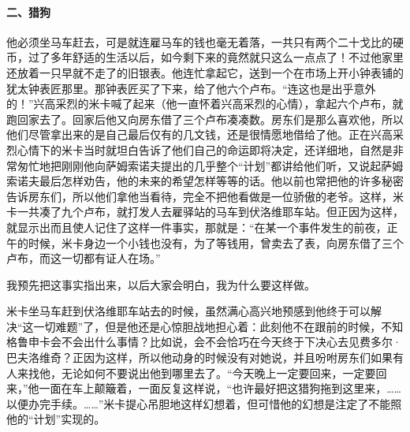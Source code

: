 \paragraph*{二、猎狗}
\par 他必须坐马车赶去，可是就连雇马车的钱也毫无着落，一共只有两个二十戈比的硬币，过了多年舒适的生活以后，如今剩下来的竟然就只这么一点点了！不过他家里还放着一只早就不走了的旧银表。他连忙拿起它，送到一个在市场上开小钟表铺的犹太钟表匠那里。那钟表匠买了下来，给了他六个卢布。“连这也是出乎意外的！”兴高采烈的米卡喊了起来（他一直怀着兴高采烈的心情），拿起六个卢布，就跑回家去了。回家后他又向房东借了三个卢布凑凑数。房东们是那么喜欢他，所以他们尽管拿出来的是自己最后仅有的几文钱，还是很情愿地借给了他。正在兴高采烈心情下的米卡当时就坦白告诉了他们自己的命运即将决定，还详细地，自然是非常匆忙地把刚刚他向萨姆索诺夫提出的几乎整个“计划”都讲给他们听，又说起萨姆索诺夫最后怎样劝告，他的未来的希望怎样等等的话。他以前也常把他的许多秘密告诉房东们，所以他们拿他当看待，完全不把他看做是一位骄傲的老爷。这样，米卡一共凑了九个卢布，就打发人去雇驿站的马车到伏洛维耶车站。但正因为这样，就显示出而且使人记住了这样一件事实，那就是：“在某一个事件发生的前夜，正午的时候，米卡身边一个小钱也没有，为了等钱用，曾卖去了表，向房东借了三个卢布，而这一切都有证人在场。”
\par 我预先把这事实指出来，以后大家会明白，我为什么要这样做。
\par 米卡坐马车赶到伏洛维耶车站去的时候，虽然满心高兴地预感到他终于可以解决“这一切难题”了，但是他还是心惊胆战地担心着：此刻他不在跟前的时候，不知格鲁申卡会不会出什么事情？比如说，会不会恰巧在今天终于下决心去见费多尔·巴夫洛维奇？正因为这样，所以他动身的时候没有对她说，并且吩咐房东们如果有人来找他，无论如何不要说出他到哪里去了。“今天晚上一定要回来，一定要回来，”他一面在车上颠簸着，一面反复这样说，“也许最好把这猎狗拖到这里来，……以便办完手续。……”米卡提心吊胆地这样幻想着，但可惜他的幻想是注定了不能照他的“计划”实现的。
